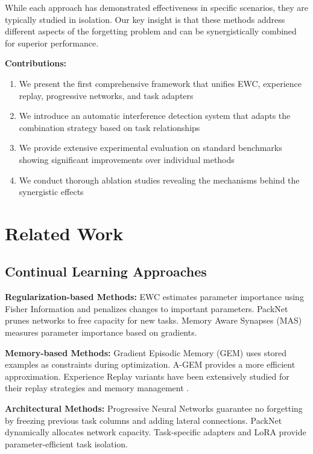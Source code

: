 \documentclass{article}
\begin{document}
While each approach has demonstrated effectiveness in specific scenarios, they are typically studied in isolation. Our key insight is that these methods address different aspects of the forgetting problem and can be synergistically combined for superior performance.

\textbf{Contributions:}
\begin{enumerate}
    \item We present the first comprehensive framework that unifies EWC, experience replay, progressive networks, and task adapters
    \item We introduce an automatic interference detection system that adapts the combination strategy based on task relationships
    \item We provide extensive experimental evaluation on standard benchmarks showing significant improvements over individual methods
    \item We conduct thorough ablation studies revealing the mechanisms behind the synergistic effects
\end{enumerate}

\section{Related Work}

\subsection{Continual Learning Approaches}

\textbf{Regularization-based Methods:} EWC \cite{kirkpatrick2017overcoming} estimates parameter importance using Fisher Information and penalizes changes to important parameters. PackNet \cite{mallya2018packnet} prunes networks to free capacity for new tasks. Memory Aware Synapses (MAS) \cite{aljundi2018memory} measures parameter importance based on gradients.

\textbf{Memory-based Methods:} Gradient Episodic Memory (GEM) \cite{lopez2017gradient} uses stored examples as constraints during optimization. A-GEM \cite{chaudhry2018efficient} provides a more efficient approximation. Experience Replay variants have been extensively studied for their replay strategies and memory management \cite{riemer2018learning}.

\textbf{Architectural Methods:} Progressive Neural Networks \cite{rusu2016progressive} guarantee no forgetting by freezing previous task columns and adding lateral connections. PackNet \cite{mallya2018packnet} dynamically allocates network capacity. Task-specific adapters and LoRA \cite{hu2022lora} provide parameter-efficient task isolation.
\end{document}

